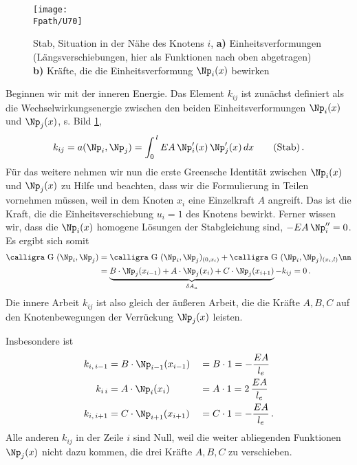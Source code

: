 {{{{%
\begin{figure}
\centering
{\texttt{[image: \\Fpath/U70]}}
  \caption{Stab, Situation in der N\"{a}he des Knotens $i$, \textbf{ a)} Einheitsverformungen (L\"{a}ngsverschiebungen, hier als Funktionen nach oben abgetragen)
  \textbf{ b)} Kr\"{a}fte, die die Einheitsverformung $\Np_i(x)$ bewirken}
  \label{U70}
%
\end{figure}
Beginnen wir mit der inneren Energie. Das Element $k_{ij}$ ist zun\"{a}chst definiert als die Wechselwirkungsenergie zwischen den beiden Einheitsverformungen $\Np_i(x)$ und $\Np_j(x)$, s. Bild \ref{U70},
\begin{align}
k_{ij} = a(\Np_i,\Np_j) = \int_0^{\,l} EA\,\Np_i'(x)\,\Np_j'(x)\,dx \qquad \text{(Stab)}\,.
\end{align}
F\"{u}r das weitere nehmen wir nun die erste Greensche Identit\"{a}t zwischen $\Np_i(x)$ und $\Np_j(x)$ zu Hilfe und beachten, dass wir die Formulierung in Teilen vornehmen m\"{u}ssen, weil in dem Knoten  $x_i$  eine Einzelkraft $A$ angreift. Das ist die Kraft, die die Einheitsverschiebung $u_i = 1$ des Knotens bewirkt. Ferner wissen wir, dass die $\Np_i(x)$ homogene L\"{o}sungen der Stabgleichung sind, $- EA\,\Np_i'' = 0$. Es ergibt sich somit
\begin{align}
\text{\normalfont\calligra G\,\,}(\Np_i,\Np_j) &= \text{\normalfont\calligra G\,\,}(\Np_i,\Np_j)_{(0,x_i)} +
\text{\normalfont\calligra G\,\,}(\Np_i,\Np_j)_{(x_i,l)} \nn \\
&= \underbrace{B \cdot\Np_j(x_{i-1}) + A\cdot \Np_j(x_i) + C\cdot\Np_j(x_{i+1})}_{\delta A_a} -  k_{ij} = 0\,.
\end{align}
Die innere Arbeit $k_{ij}$ ist also gleich der \"{a}u{\ss}eren Arbeit, die die Kr\"{a}fte $A, B, C$ auf den Knotenbewegungen
der Verr\"{u}ckung $\Np_j(x)$ leisten.

Insbesondere ist
\begin{alignat}{3}
k_{i,\,i-1} &= B \cdot \Np_{i-1}(x_{i-1}) &&= B \cdot 1 = - \frac{EA}{l_e} \\
k_{i\,i} &= A \cdot \Np_{i}(x_{i}) &&= A \cdot 1 = 2\, \frac{EA}{l_e} \\
k_{i,\,i+1} &= C \cdot \Np_{i+1}(x_{i+1}) &&= C \cdot 1 = - \frac{EA}{l_e}\,.
\end{alignat}
Alle anderen $k_{ij}$ in der Zeile $i$ sind Null, weil die weiter abliegenden Funktionen $\Np_j(x)$ nicht dazu kommen, die drei Kr\"{a}fte $A, B, C$ zu verschieben.

}}}}
